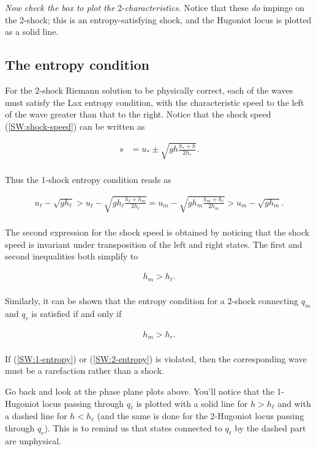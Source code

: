 \documentclass{SIAMbook2016}
\begin{document}
\emph{Now check the box to plot the} 2-\emph{characteristics.} Notice
that these \emph{do} impinge on the 2-shock; this is an
entropy-satisfying shock, and the Hugoniot locus is plotted as a solid
line.

\hypertarget{the-entropy-condition}{%
\subsection{The entropy condition}\label{the-entropy-condition}}

For the 2-shock Riemann solution to be physically correct, each of the
waves must satisfy the Lax entropy condition, with the characteristic
speed to the left of the wave greater than that to the right. Notice
that the shock speed (\ref{SW:shock-speed}) can be written as

\begin{align}
    s & = u_* \pm \sqrt{gh \frac{h_* + h}{2h_*} }.
\end{align}\\
Thus the 1-shock entropy condition reads as

\begin{align*}
u_\ell - \sqrt{gh_\ell} > u_\ell - \sqrt{gh_\ell \frac{h_\ell+h_m}{2h_\ell}} = u_m - \sqrt{gh_m \frac{h_m+h_\ell}{2h_m}} > u_m - \sqrt{gh_m}.
\end{align*}\\
The second expression for the shock speed is obtained by noticing that
the shock speed is invariant under transposition of the left and right
states. The first and second inequalities both simplify to

\begin{align} \label{SW:1-entropy}
    h_m > h_\ell.
\end{align}\\
Similarly, it can be shown that the entropy condition for a 2-shock
connecting \(q_m\) and \(q_r\) is satisfied if and only if

\begin{align} \label{SW:2-entropy}
    h_m > h_r.
\end{align}\\
If (\ref{SW:1-entropy}) or (\ref{SW:2-entropy}) is violated, then the
corresponding wave must be a rarefaction rather than a shock.

Go back and look at the phase plane plots above. You'll notice that the
1-Hugoniot locus passing through \(q_\ell\) is plotted with a solid line
for \(h>h_\ell\) and with a dashed line for \(h<h_\ell\) (and the same
is done for the 2-Hugoniot locus passing through \(q_r\)). This is to
remind us that states connected to \(q_\ell\) by the dashed part are
unphysical.
\end{document}
